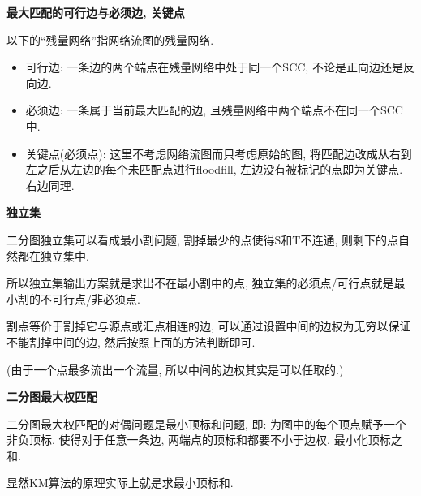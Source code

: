 \textbf{最大匹配的可行边与必须边, 关键点}

以下的``残量网络''指网络流图的残量网络.

\begin{itemize}
	\item 可行边: 一条边的两个端点在残量网络中处于同一个SCC, 不论是正向边还是反向边.

	\item 必须边: 一条属于当前最大匹配的边, 且残量网络中两个端点不在同一个SCC中.
	
	\item 关键点(必须点): 这里不考虑网络流图而只考虑原始的图, 将匹配边改成从右到左之后从左边的每个未匹配点进行floodfill, 左边没有被标记的点即为关键点. 右边同理.
\end{itemize}

\textbf{独立集}

二分图独立集可以看成最小割问题, 割掉最少的点使得S和T不连通, 则剩下的点自然都在独立集中.

所以独立集输出方案就是求出不在最小割中的点, 独立集的必须点/可行点就是最小割的不可行点/非必须点.

割点等价于割掉它与源点或汇点相连的边, 可以通过设置中间的边权为无穷以保证不能割掉中间的边, 然后按照上面的方法判断即可.

(由于一个点最多流出一个流量, 所以中间的边权其实是可以任取的.)

\textbf{二分图最大权匹配}

二分图最大权匹配的对偶问题是最小顶标和问题, 即: 为图中的每个顶点赋予一个非负顶标, 使得对于任意一条边, 两端点的顶标和都要不小于边权, 最小化顶标之和.

显然KM算法的原理实际上就是求最小顶标和.